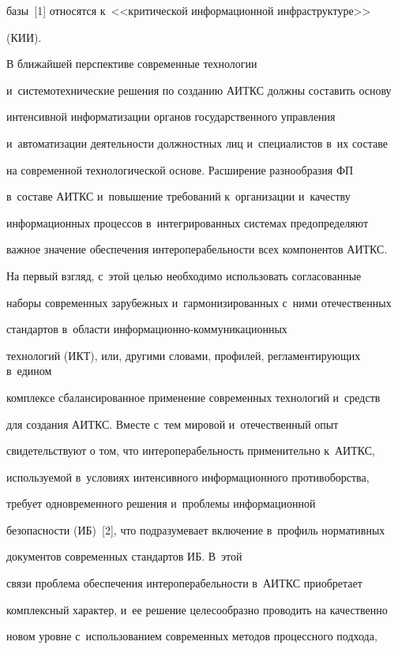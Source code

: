 базы~[1] относятся к~<<критической информационной инфраструктуре>> 

(КИИ). 

     

     В ближайшей перспективе современные технологии 

и~системотехнические решения по созданию АИТКС должны составить основу 

интенсивной информатизации органов государственного управления 

и~автоматизации деятельности должностных лиц и~специалистов в~их составе 

на современной технологической основе. Расширение разнообразия ФП 

в~составе АИТКС и~повышение требований к~организации и~качеству 

информационных процессов в~интегрированных сис\-те\-мах предопределяют 

важное значение обеспечения интероперабельности всех компонентов АИТКС. 

На первый взгляд, с~этой целью необходимо использовать согласованные 

наборы современных зарубежных и~гармонизированных с~ними отечественных 

стандартов в~области ин\-фор\-ма\-ци\-он\-но-ком\-му\-ни\-ка\-ци\-он\-ных 

технологий (ИКТ), или, другими словами, профилей, регламентирующих в~едином 

комплексе сбалансированное применение современных технологий и~средств 

для создания АИТКС. Вместе с~тем мировой и~отечественный опыт 

свидетельствуют о том, что интероперабельность применительно к~АИТКС, 

используемой в~условиях интенсивного информационного противоборства, 

требует одновременного решения и~проблемы информационной 

безопасности (ИБ)~[2], что подразумевает включение в~профиль нормативных 

документов современных стандартов ИБ. В~этой 

связи проблема обеспечения интероперабельности в~АИТКС приобретает 

комплексный характер, и~ее решение целесообразно проводить на качественно 

новом уровне с~использованием современных методов процессного подхода, 

